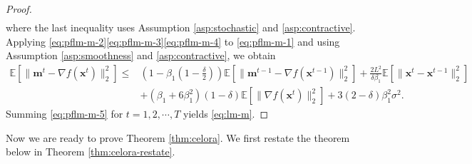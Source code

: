 \begin{proof}
\begin{align}
    \end{align}
    where the last inequality uses Assumption \ref{asp:stochastic} and \ref{asp:contractive}.
    Applying \eqref{eq:pflm-m-2}\eqref{eq:pflm-m-3}\eqref{eq:pflm-m-4} to \eqref{eq:pflm-m-1} and using Assumption \ref{asp:smoothness} and \ref{asp:contractive}, we obtain
    \begin{align}
    \mathbb{E}[\|\mathbf{m}^t-\nabla f(\mathbf{x}^t)\|_2^2]\le&\left(1-\beta_1\left(1-\frac{\delta}{2}\right)\right)\mathbb{E}[\|\mathbf{m}^{t-1}-\nabla f(\mathbf{x}^{t-1})\|_2^2]+\frac{2L^2}{\delta\beta_1}\mathbb{E}[\|\mathbf{x}^t-\mathbf{x}^{t-1}\|_2^2]\nonumber\\
    &+(\beta_1+6\beta_1^2)(1-\delta)\mathbb{E}[\|\nabla f(\mathbf{x}^t)\|_2^2]+3(2-\delta)\beta_1^2\sigma^2.\label{eq:pflm-m-5}
    \end{align}
    Summing \eqref{eq:pflm-m-5} for $t=1,2,\cdots,T$ yields \eqref{eq:lm-m}.
\end{proof}

Now we are ready to prove Theorem \ref{thm:celora}. We first restate the theorem below in Theorem \ref{thm:celora-restate}.

